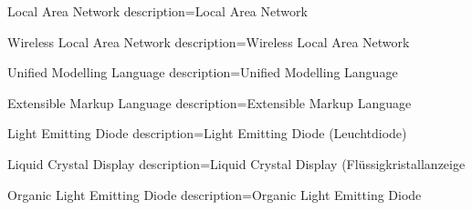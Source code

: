 {Local Area Network}
{description=Local Area Network}

{Wireless Local Area Network}
{description=Wireless Local Area Network}

{Unified Modelling Language}
{description=Unified Modelling Language}

{Extensible Markup Language}
{description=Extensible Markup Language}

{Light Emitting Diode}
{description=Light Emitting Diode (Leuchtdiode)}

{Liquid Crystal Display}
{description=Liquid Crystal Display (Flüssigkristallanzeige}

{Organic Light Emitting Diode}
{description=Organic Light Emitting Diode}

